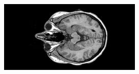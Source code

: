 \begin{figure}[ht]
\begin{minipage}[c]{0.3\linewidth}
        \end{minipage}
        \begin{minipage}[c]{0.3\linewidth}
            \centering
            \includegraphics[width=\textwidth]{Files/report_images/axial_example3.jpg}
        \end{minipage}


\end{figure}

